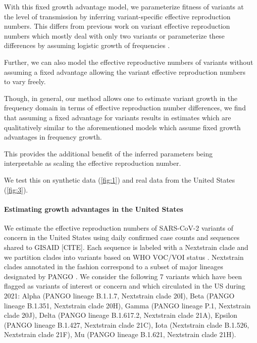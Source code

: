 \documentclass[11pt,oneside,letterpaper]{article}
\begin{document}
With this fixed growth advantage model, we parameterize fitness of variants at the level of transmission by inferring variant-specific effective reproduction numbers. This differs from previous work on variant effective reproduction numbers which mostly deal with only two variants or parameterize these differences by assuming logistic growth of frequencies \cite{Vhringer2021}. %

Further, we can also model the effective reproductive numbers of variants without assuming a fixed advantage allowing the variant effective reproduction numbers to vary freely. 

Though, in general, our method allows one to estimate variant growth in the frequency domain in terms of effective reproduction number differences, we find that assuming a fixed advantage for variants results in estimates which are qualitatively similar to the aforementioned models which assume fixed growth advantages in frequency growth.

This provides the additional benefit of the inferred parameters being interpretable as scaling the effective reproduction number.

We test this on synthetic data (\ref{fig:1}) and real data from the United States (\ref{fig:3}). %

\paragraph{Estimating growth advantages in the United States}

We estimate the effective reproduction numbers of SARS-CoV-2 variants of concern in the United States using daily confirmed case counts and sequences shared to GISAID [CITE]. %
Each sequence is labeled with a Nextstrain clade \cite{Hadfield2018} and we partition clades into variants based on WHO VOC/VOI status \cite{Konings2021}.
Nextstrain clades annotated in the fashion correspond to a subset of major lineages designated by PANGO \cite{Rambaut2020}.
We consider the following 7 variants which have been flagged as variants of interest or concern and which circulated in the US during 2021: Alpha (PANGO lineage B.1.1.7, Nextstrain clade 20I), Beta (PANGO lineage B.1.351, Nextstrain clade 20H), Gamma (PANGO lineage P.1, Nextstrain clade 20J), Delta (PANGO lineage B.1.617.2, Nextstrain clade 21A), Epsilon (PANGO lineage B.1.427, Nextstrain clade 21C), Iota (Nextstrain clade B.1.526, Nextstrain clade 21F), Mu (PANGO lineage B.1.621, Nextstrain clade 21H).
\end{document}
